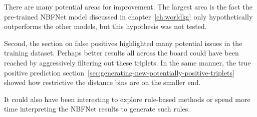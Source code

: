 There are many potential areas for improvement.
The largest area is the fact the pre-trained NBFNet model discussed in chapter~\ref{ch:worldkg} only hypothetically
outperforms the other models, but this hypothesis was not tested.

Second, the section on false positives highlighted many potential issues in the training dataset.
Perhaps better results all across the board could have been reached by aggressively filtering out these triplets.
In the same manner, the true positive prediction section~\ref{sec:generating-new-potentially-positive-triplets} showed how restrictive the distance bins are on the smaller end.

It could also have been interesting to explore rule-based methods or spend more time interpreting the NBFNet results
to generate such rules.